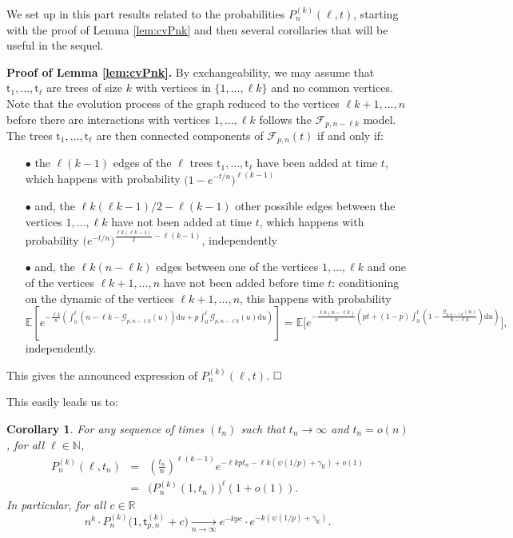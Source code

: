 \documentclass[a4, 11pt]{article}
\numberwithin{equation}{section}
\theoremstyle{plain}
\newtheorem{corollary}[theorem]{Corollary}
\theoremstyle{definition}
\theoremstyle{remark}
\begin{document}
We set up in this part results related to the probabilities $P_n^{(k)}(\ell,t)$, starting with the proof of Lemma \ref{lem:cvPnk} and then several corollaries that will be useful in the sequel.

\bigskip

\textbf{Proof of Lemma \ref{lem:cvPnk}.} By exchangeability, we  may assume that $\mathrm t_1,\ldots,\mathrm t_\ell$ are trees of size $k$ with vertices in $\{1,\ldots,\ell k\}$ and no common vertices. Note that the evolution process of the graph reduced to the vertices $\ell k+1,\ldots,n$ before there are interactions with vertices $1,\ldots, \ell k$ follows the $\mathcal F_{p,n-\ell k}$ model. The trees $\mathrm t_1,\ldots,\mathrm t_\ell$ are then connected components of  $\mathcal {F}_{p,n}(t)$ if and only if:
\vspace{-0.3cm}
\begin{enumerate}[leftmargin=0.8cm]
\item[$\bullet$] the $\ell (k-1)$ edges of the $\ell$ trees $\mathrm t_1,\ldots,\mathrm t_\ell$ have been added at time $t$, which happens with probability $\big(1-e^{-t/n}\big)^{\ell(k-1)}$
\item[$\bullet$] and, the $\ell k(\ell k-1)/2-\ell(k-1)$ other possible edges between the vertices  $1,\ldots,\ell k$ have not been added at time $t$, which happens with probability $\big(e^{-t/n}\big)^{\frac{\ell k(\ell k-1)}{2}-\ell(k-1)}$, independently
\item[$\bullet$] and, the $\ell k(n-\ell k)$ edges between one of the vertices $1,\ldots,\ell k$ and one of the vertices $\ell k+1,\ldots,n$ have not been added before time $t$: conditioning on the dynamic of the vertices $\ell k+1,\ldots,n$, this happens with probability
$$\mathbb E\left[e^{-\frac{\ell k}{n}\left(\int_0^t \left(n-\ell k-\mathcal G_{p,n-\ell k}(u)\right)\mathrm du+p\int_0^t \mathcal G_{p,n-\ell k}(u) \mathrm du\right)} \right] =\mathbb E\Bigg[e^{-\frac{\ell k(n-\ell k)}{n}\left(pt + (1-p) \int_0^t  \left(1-\frac{\mathcal G_{p,n-\ell k}(u)}{n-\ell k} \right)\mathrm du\right)} \Bigg],$$ independently.
\end{enumerate}
This gives the announced expression of $P^{(k)}_n(\ell,t)$.
$\hfill \square$

\bigskip

This easily leads us to:

\begin{corollary}
\label{cor:cvP}
For any sequence of times $(t_n)$ such that $t_n \rightarrow \infty$ and $t_n=o(n)$, for all $\ell \in \mathbb N$,
\begin{eqnarray*}
P^{(k)}_n(\ell,t_n)
 &=&\left( \frac{t_n}{n}\right)^{\ell(k-1)}e^{-\ell kpt_n-\ell k\left(\psi(1/p)+\gamma_{\mathrm E}\right) +o(1)} \\
 &=& \big(P^{(k)}_n(1,t_n)\big)^{\ell}\left(1+o(1)\right).
\end{eqnarray*}
In particular,
for all $c \in \mathbb R$
$$
n^k \cdot P^{(k)}_n\big(1,\mathsf t^{(k)}_{p,n}+c\big) \underset{n \rightarrow \infty} \longrightarrow e^{-kpc} \cdot e^{-k\left(\psi(1/p)+\gamma_{\mathrm E}\right)}.
$$
\end{corollary}
\end{document}
